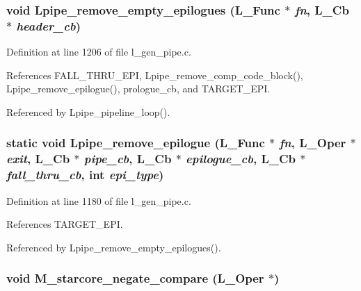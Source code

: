 \subsubsection{\setlength{\rightskip}{0pt plus 5cm}void Lpipe\_\-remove\_\-empty\_\-epilogues (L\_\-Func $\ast$ {\em fn}, L\_\-Cb $\ast$ {\em header\_\-cb})}\label{l__gen__pipe_8c_5b2118879870ec2987266350b965aa44}




Definition at line 1206 of file l\_\-gen\_\-pipe.c.

References FALL\_\-THRU\_\-EPI, Lpipe\_\-remove\_\-comp\_\-code\_\-block(), Lpipe\_\-remove\_\-epilogue(), prologue\_\-cb, and TARGET\_\-EPI.

Referenced by Lpipe\_\-pipeline\_\-loop().
\subsubsection{\setlength{\rightskip}{0pt plus 5cm}static void Lpipe\_\-remove\_\-epilogue (L\_\-Func $\ast$ {\em fn}, L\_\-Oper $\ast$ {\em exit}, L\_\-Cb $\ast$ {\em pipe\_\-cb}, L\_\-Cb $\ast$ {\em epilogue\_\-cb}, L\_\-Cb $\ast$ {\em fall\_\-thru\_\-cb}, int {\em epi\_\-type})\hspace{0.3cm}{\tt  [static]}}\label{l__gen__pipe_8c_e6db76f9944ace66b43330c69c01141d}




Definition at line 1180 of file l\_\-gen\_\-pipe.c.

References TARGET\_\-EPI.

Referenced by Lpipe\_\-remove\_\-empty\_\-epilogues().
\subsubsection{\setlength{\rightskip}{0pt plus 5cm}void M\_\-starcore\_\-negate\_\-compare (L\_\-Oper $\ast$)}\label{l__gen__pipe_8c_342fb7dd4cac19f8ee85a2eafcca5b6a}


